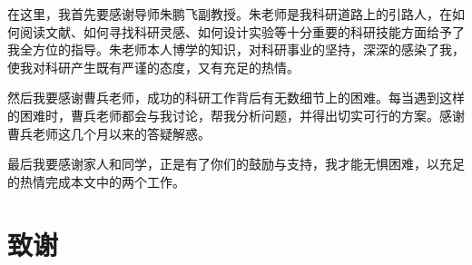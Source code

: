 
在这里，我首先要感谢导师朱鹏飞副教授。朱老师是我科研道路上的引路人，在如何阅读文献、如何寻找科研灵感、如何设计实验等十分重要的科研技能方面给予了我全方位的指导。朱老师本人博学的知识，对科研事业的坚持，深深的感染了我，使我对科研产生既有严谨的态度，又有充足的热情。

然后我要感谢曹兵老师，成功的科研工作背后有无数细节上的困难。每当遇到这样的困难时，曹兵老师都会与我讨论，帮我分析问题，并得出切实可行的方案。感谢曹兵老师这几个月以来的答疑解惑。

最后我要感谢家人和同学，正是有了你们的鼓励与支持，我才能无惧困难，以充足的热情完成本文中的两个工作。


\chapter*{致\qquad 谢}
